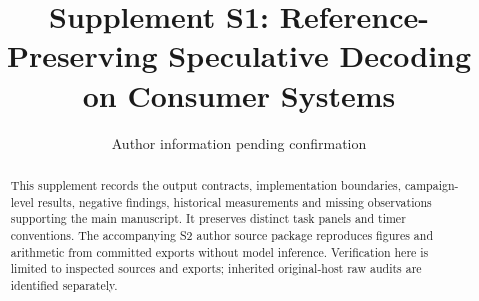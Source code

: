 \documentclass[preprint,12pt,nopreprintline]{elsarticle}
\begin{document}
\begin{frontmatter}
\title{Supplement S1: Reference-Preserving Speculative Decoding on Consumer Systems}
\author{Author information pending confirmation}
\begin{abstract}
This supplement records the output contracts, implementation boundaries, campaign-level results, negative findings, historical measurements and missing observations supporting the main manuscript. It preserves distinct task panels and timer conventions. The accompanying S2 author source package reproduces figures and arithmetic from committed exports without model inference. Verification here is limited to inspected sources and exports; inherited original-host raw audits are identified separately.
\end{abstract}
\end{frontmatter}
\renewcommand{\thesection}{S\arabic{section}}
\renewcommand{\thetable}{S\arabic{table}}







\begingroup\small

\endgroup
\end{document}
